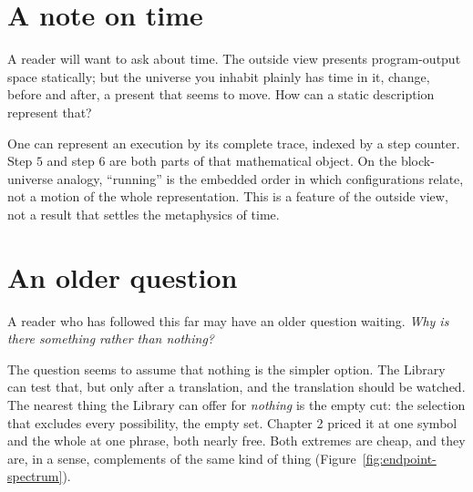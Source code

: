 \section*{A note on time}

A reader will want to ask about time. The outside view presents program-output space statically; but the universe you inhabit plainly has time in it, change, before and after, a present that seems to move. How can a static description represent that?

One can represent an execution by its complete trace, indexed by a step counter. Step $5$ and step $6$ are both parts of that mathematical object. On the block-universe analogy, ``running'' is the embedded order in which configurations relate, not a motion of the whole representation. This is a feature of the outside view, not a result that settles the metaphysics of time.

\section*{An older question}

A reader who has followed this far may have an older question waiting. \emph{Why is there something rather than nothing?}

The question seems to assume that nothing is the simpler option. The Library can test that, but only after a translation, and the translation should be watched. The nearest thing the Library can offer for \emph{nothing} is the empty cut: the selection that excludes every possibility, the empty set. Chapter 2 priced it at one symbol and the whole at one phrase, both nearly free. Both extremes are cheap, and they are, in a sense, complements of the same kind of thing (Figure~\ref{fig:endpoint-spectrum}).

